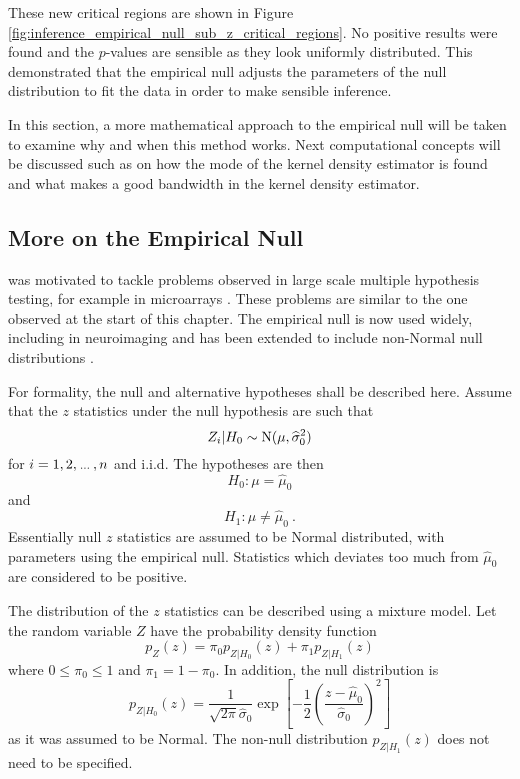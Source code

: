 These new critical regions are shown in Figure \ref{fig:inference_empirical_null_sub_z_critical_regions}. No positive results were found and the $p$-values are sensible as they look uniformly distributed. This demonstrated that the empirical null adjusts the parameters of the null distribution to fit the data in order to make sensible inference.

In this section, a more mathematical approach to the empirical null will be taken to examine why and when this method works. Next computational concepts will be discussed such as on how the mode of the kernel density estimator is found and what makes a good bandwidth in the kernel density estimator. 


\subsection{More on the Empirical Null}

\cite{efron2004large} was motivated to tackle problems observed in large scale multiple hypothesis testing, for example in microarrays \citep{hedenfalk2001gene, efron2002empirical, efron2003robbins}. These problems are similar to the one observed at the start of this chapter. The empirical null is now used widely, including in neuroimaging \citep{schwartzman2008false, schwartzman2009empirical} and has been extended to include non-Normal null distributions \citep{schwartzman2008false, schwartzman2008empirical}.

For formality, the null and alternative hypotheses shall be described here. Assume that the $z$ statistics under the null hypothesis are such that
\begin{equation}
	Z_i|H_0\sim\operatorname{N}(\mu,\widehat{\sigma}_0^2)
\end{equation}
for $i=1,2,\dotdotdot,n$ and i.i.d. The hypotheses are then
\begin{equation}
	H_0:\mu = \widehat{\mu}_0
\end{equation}
and
\begin{equation}
	H_1:\mu\neq\widehat{\mu}_0
	\ .
\end{equation}
Essentially null $z$ statistics are assumed to be Normal distributed, with parameters using the empirical null. Statistics which deviates too much from $\widehat{\mu}_0$ are considered to be positive.

The distribution of the $z$ statistics can be described using a mixture model. Let the random variable $Z$ have the probability density function
\begin{equation}
	p_Z(z) =
	\pi_0 p_{Z|H_0}(z) + \pi_1 p_{Z|H_1}(z)
\end{equation}
where $0\leqslant\pi_0\leqslant 1$ and  $\pi_1 = 1-\pi_0$. In addition, the null distribution is
\begin{equation}
	p_{Z|H_0}(z) = 
	\dfrac{1}{\sqrt{2\pi}\widehat{\sigma}_0}
	\exp\left[
		-\dfrac{1}{2}
		\left(
			\dfrac{z-\widehat{\mu}_0}{\widehat{\sigma}_0}
		\right)^2
	\right]
\end{equation}
as it was assumed to be Normal. The non-null distribution $p_{Z|H_1}(z)$ does not need to be specified.

